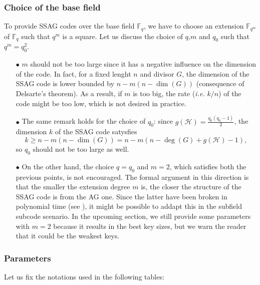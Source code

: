 \documentclass[10pt]{article}
\theoremstyle{definition}
\theoremstyle{definition}
\theoremstyle{definition}
\newcommand{\calH}{\mathcal{H}}
\newcommand{\Fqm}{\mathbb{F}_{q^m}}
\newcommand{\Fq}{\mathbb{F}_q}
\begin{document}
\subsubsection{Choice of the base field}


To provide SSAG codes over the base field $\Fq$, we have to choose an extension $\Fqm$ of $\Fq$ such that $q^m$ is a square. Let us discuss the choice of $q$,$m$ and $q_0$ such that $q^m=q_0^2$.

\begin{enumerate}
\item[$\bullet$] $m$ should not be too large since it has a negative influence on the dimension of the code. In fact, for a fixed lenght $n$ and divisor $G$, the dimension of the SSAG code is lower bounded by $n-m(n-\dim(G))$ (consequence of Delsarte's theorem). As a result, if $m$ is too big, the rate (\textit{i.e.} $k/n$) of the code might be too low, which is not desired in practice.
\item[$\bullet$] The same remark holds for the choice of $q_0$: since $g(\calH)=\frac{q_0(q_0-1)}{2}$, the dimension $k$ of the SSAG code satysfies 
\[k \geq n-m(n-\dim(G)) = n-m(n- \deg(G) +g(\calH)-1),\]
so $q_0$ should not be too large as well.
\item[$\bullet$] On the other hand, the choice $q=q_0$ and $m=2$, which satisfies both the previous points, is not encouraged. The formal argument in this direction is that the smaller the extension degree $m$ is, the closer the structure of the SSAG code is from the AG one. Since the latter have been broken in polynomial time (see \cite{Cou}), it might be possible to addapt this in the subfield subcode scenario. In the upcoming section, we still provide some parameters with $m=2$ because it results in the best key sizes, but we warn the reader that it could be the weakest keys. 
\end{enumerate}
 

\subsubsection{Parameters} \label{some parameters}


Let us fix the notations used in the following tables:
\end{document}
